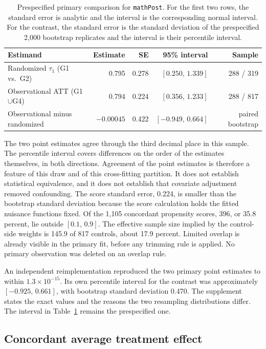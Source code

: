 \documentclass[11pt]{article}
\theoremstyle{remark}
\begin{document}
\begin{table}[t]
\centering
\caption{Prespecified primary comparison for \texttt{mathPost}. For the first two rows, the standard error is analytic and the interval is the corresponding normal interval. For the contrast, the standard error is the standard deviation of the prespecified 2{,}000 bootstrap replicates and the interval is their percentile interval.}
\label{tab:primary}
\begin{tabular}{lrrrr}
\toprule
Estimand & Estimate & SE & 95\% interval & Sample \\
\midrule
Randomized $\tau_1$ (G1 vs.\ G2) & 0.795 & 0.278 & $[0.250,\,1.339]$ & 288 / 319 \\
Observational ATT (G1$\cup$G4) & 0.794 & 0.224 & $[0.356,\,1.233]$ & 288 / 817 \\
Observational minus randomized & $-0.00045$ & 0.422 & $[-0.949,\,0.664]$ & paired bootstrap \\
\bottomrule
\end{tabular}
\end{table}

The two point estimates agree through the third decimal place in this sample. The percentile interval covers differences on the order of the estimates themselves, in both directions. Agreement of the point estimates is therefore a feature of this draw and of this cross-fitting partition. It does not establish statistical equivalence, and it does not establish that covariate adjustment removed confounding. The score standard error, 0.224, is smaller than the bootstrap standard deviation because the score calculation holds the fitted nuisance functions fixed. Of the 1{,}105 concordant propensity scores, 396, or 35.8 percent, lie outside $[0.1,\,0.9]$. The effective sample size implied by the control-side weights is 145.9 of 817 controls, about 17.9 percent. Limited overlap is already visible in the primary fit, before any trimming rule is applied. No primary observation was deleted on an overlap rule.

An independent reimplementation reproduced the two primary point estimates to within $1.3\times 10^{-15}$. Its own percentile interval for the contrast was approximately $[-0.925,\,0.661]$, with bootstrap standard deviation 0.470. The supplement states the exact values and the reasons the two resampling distributions differ. The interval in Table~\ref{tab:primary} remains the prespecified one.

\subsection{Concordant average treatment effect}
\end{document}

